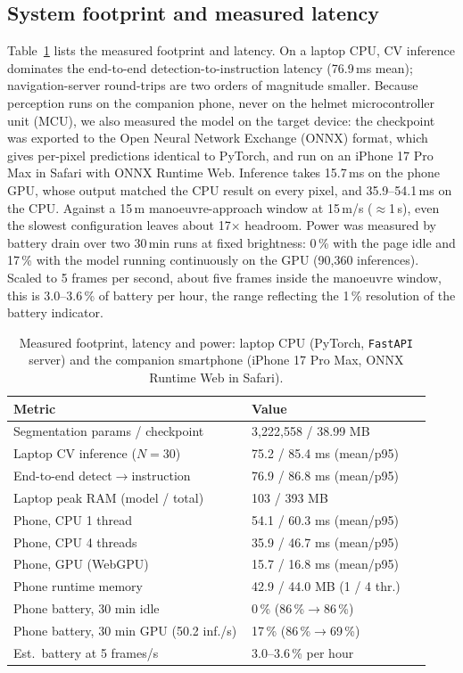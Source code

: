 \documentclass[conference]{IEEEtran}
\begin{document}
\subsection{System footprint and measured latency}
\label{sec:footprint}
Table~\ref{tab:footprint} lists the measured footprint and latency. On a laptop CPU, CV inference dominates the end-to-end detection-to-instruction latency (76.9\,ms mean); navigation-server round-trips are two orders of magnitude smaller. Because perception runs on the companion phone, never on the helmet microcontroller unit (MCU), we also measured the model on the target device: the checkpoint was exported to the Open Neural Network Exchange (ONNX) format, which gives per-pixel predictions identical to PyTorch, and run on an iPhone 17 Pro Max in Safari with ONNX Runtime Web. Inference takes 15.7\,ms on the phone GPU, whose output matched the CPU result on every pixel, and 35.9--54.1\,ms on the CPU. Against a 15\,m manoeuvre-approach window at 15\,m/s ($\approx$1\,s), even the slowest configuration leaves about 17$\times$ headroom. Power was measured by battery drain over two 30\,min runs at fixed brightness: 0\,\% with the page idle and 17\,\% with the model running continuously on the GPU (90{,}360 inferences). Scaled to 5 frames per second, about five frames inside the manoeuvre window, this is 3.0--3.6\,\% of battery per hour, the range reflecting the 1\,\% resolution of the battery indicator.

\begin{table}[t]
\centering
\caption{Measured footprint, latency and power: laptop CPU (PyTorch, \texttt{FastAPI} server) and the companion smartphone (iPhone 17 Pro Max, ONNX Runtime Web in Safari).}
\label{tab:footprint}
\setlength{\tabcolsep}{4pt}
\begin{tabular}{@{}p{0.53\linewidth}p{0.4\linewidth}@{}}
\toprule
\textbf{Metric} & \textbf{Value}\\
\midrule
Segmentation params / checkpoint     & 3{,}222{,}558 / 38.99 MB\\
Laptop CV inference ($N{=}30$) & 75.2 / 85.4 ms (mean/p95)\\
End-to-end detect$\rightarrow$instruction & 76.9 / 86.8 ms (mean/p95)\\
Laptop peak RAM (model / total) & 103 / 393 MB\\
\midrule
Phone, CPU 1 thread & 54.1 / 60.3 ms (mean/p95)\\
Phone, CPU 4 threads & 35.9 / 46.7 ms (mean/p95)\\
Phone, GPU (WebGPU) & 15.7 / 16.8 ms (mean/p95)\\
Phone runtime memory & 42.9 / 44.0 MB (1 / 4 thr.)\\
Phone battery, 30 min idle & 0\,\% (86\,\%$\rightarrow$86\,\%)\\
Phone battery, 30 min GPU (50.2 inf./s) & 17\,\% (86\,\%$\rightarrow$69\,\%)\\
Est.\ battery at 5 frames/s & 3.0--3.6\,\% per hour\\
\bottomrule
\end{tabular}
\end{table}
\end{document}
